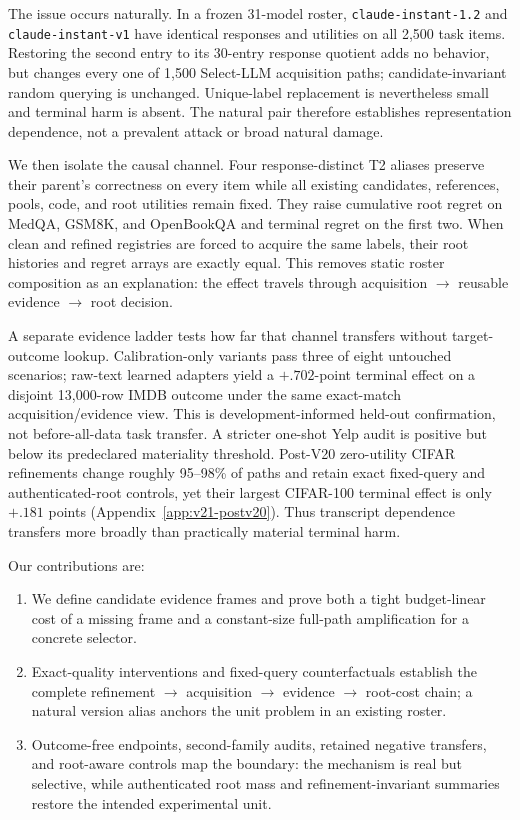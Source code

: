 The issue occurs naturally. In a frozen 31-model roster, \texttt{claude-instant-1.2} and \texttt{claude-instant-v1} have identical responses and utilities on all 2,500 task items. Restoring the second entry to its 30-entry response quotient adds no behavior, but changes every one of 1,500 Select-LLM acquisition paths; candidate-invariant random querying is unchanged. Unique-label replacement is nevertheless small and terminal harm is absent. The natural pair therefore establishes representation dependence, not a prevalent attack or broad natural damage.

We then isolate the causal channel. Four response-distinct T2 aliases preserve their parent's correctness on every item while all existing candidates, references, pools, code, and root utilities remain fixed. They raise cumulative root regret on MedQA, GSM8K, and OpenBookQA and terminal regret on the first two. When clean and refined registries are forced to acquire the same labels, their root histories and regret arrays are exactly equal. This removes static roster composition as an explanation: the effect travels through acquisition $\rightarrow$ reusable evidence $\rightarrow$ root decision.

A separate evidence ladder tests how far that channel transfers without target-outcome lookup. Calibration-only variants pass three of eight untouched scenarios; raw-text learned adapters yield a $+.702$-point terminal effect on a disjoint 13,000-row IMDB outcome under the same exact-match acquisition/evidence view. This is development-informed held-out confirmation, not before-all-data task transfer. A stricter one-shot Yelp audit is positive but below its predeclared materiality threshold. Post-V20 zero-utility CIFAR refinements change roughly 95--98\% of paths and retain exact fixed-query and authenticated-root controls, yet their largest CIFAR-100 terminal effect is only $+.181$ points (Appendix~\ref{app:v21-postv20}). Thus transcript dependence transfers more broadly than practically material terminal harm.

Our contributions are:
\begin{enumerate}
    \item We define candidate evidence frames and prove both a tight budget-linear cost of a missing frame and a constant-size full-path amplification for a concrete selector.
    \item Exact-quality interventions and fixed-query counterfactuals establish the complete refinement $\rightarrow$ acquisition $\rightarrow$ evidence $\rightarrow$ root-cost chain; a natural version alias anchors the unit problem in an existing roster.
    \item Outcome-free endpoints, second-family audits, retained negative transfers, and root-aware controls map the boundary: the mechanism is real but selective, while authenticated root mass and refinement-invariant summaries restore the intended experimental unit.
\end{enumerate}

